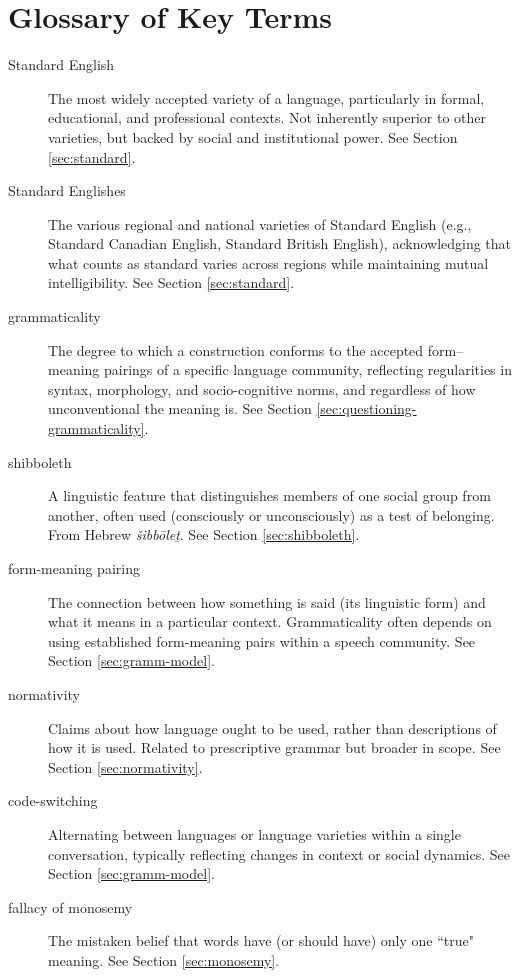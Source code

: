 \section{Glossary of Key Terms}
\begin{description}
    \item[Standard English] The most widely accepted variety of a language, particularly in formal, educational, and professional contexts. Not inherently superior to other varieties, but backed by social and institutional power. See Section \ref{sec:standard}.
    
    \item[Standard Englishes] The various regional and national varieties of Standard English (e.g., Standard Canadian English, Standard British English), acknowledging that what counts as standard varies across regions while maintaining mutual intelligibility. See Section \ref{sec:standard}.
    
    \item[grammaticality] The degree to which a construction conforms to the accepted form--meaning pairings of a specific language community, reflecting regularities in syntax, morphology, and socio-cognitive norms, and regardless of how unconventional the meaning is. See Section \ref{sec:questioning-grammaticality}.
    
    \item[shibboleth] A linguistic feature that distinguishes members of one social group from another, often used (consciously or unconsciously) as a test of belonging. From Hebrew \textit{šibbōleṯ}. See Section \ref{sec:shibboleth}.
    
    \item[form-meaning pairing] The connection between how something is said (its linguistic form) and what it means in a particular context. Grammaticality often depends on using established form-meaning pairs within a speech community. See Section \ref{sec:gramm-model}.
    
    \item[normativity] Claims about how language ought to be used, rather than descriptions of how it is used. Related to prescriptive grammar but broader in scope. See Section \ref{sec:normativity}.
    
    \item[code-switching] Alternating between languages or language varieties within a single conversation, typically reflecting changes in context or social dynamics. See Section \ref{sec:gramm-model}.
    
    \item[fallacy of monosemy] The mistaken belief that words have (or should have) only one ``true" meaning. See Section \ref{sec:monosemy}.
\end{description}

